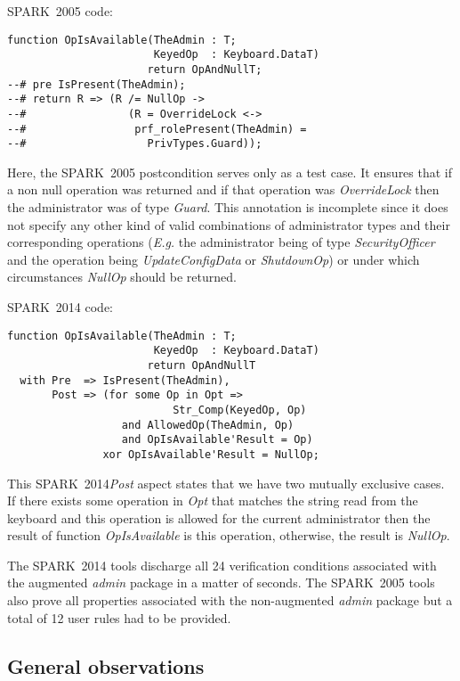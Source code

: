 \documentclass[10pt,a4paper,twocolumn]{article}
\newcommand{\oldspark}{SPARK~2005\xspace}
\newcommand{\newspark}{SPARK~2014\xspace}
\newcommand{\Eg}{\textit{E.g.}\xspace}
\begin{document}
\oldspark code:

\begin{lstlisting}
function OpIsAvailable(TheAdmin : T;
                       KeyedOp  : Keyboard.DataT)
                      return OpAndNullT;
--# pre IsPresent(TheAdmin);
--# return R => (R /= NullOp ->
--#                (R = OverrideLock <->
--#                 prf_rolePresent(TheAdmin) =
--#                   PrivTypes.Guard));
\end{lstlisting}
Here, the \oldspark postcondition serves only as a test case. It
ensures that if a non null operation was returned and if that
operation was \emph{OverrideLock} then the administrator was of type
\emph{Guard}. This annotation is incomplete since it does not specify
any other kind of valid combinations of administrator types and their
corresponding operations (\Eg the administrator being of type
\emph{SecurityOfficer} and the operation being \emph{UpdateConfigData}
or \emph{ShutdownOp}) or under which circumstances \emph{NullOp}
should be returned.

\newspark code:

\begin{lstlisting}
function OpIsAvailable(TheAdmin : T;
                       KeyedOp  : Keyboard.DataT)
                      return OpAndNullT
  with Pre  => IsPresent(TheAdmin),
       Post => (for some Op in Opt =>
                          Str_Comp(KeyedOp, Op)
                  and AllowedOp(TheAdmin, Op)
                  and OpIsAvailable'Result = Op)
               xor OpIsAvailable'Result = NullOp;
\end{lstlisting}
This \newspark \emph{Post} aspect states that we have two mutually
exclusive cases. If there exists some operation in \emph{Opt} that
matches the string read from the keyboard and this operation is
allowed for the current administrator then the result of function
\emph{OpIsAvailable} is this operation, otherwise, the result is
\emph{NullOp}.

The \newspark tools discharge all 24 verification conditions
associated with the augmented \emph{admin} package in a matter of
seconds. The \oldspark tools also prove all properties associated with
the non-augmented \emph{admin} package but a total of 12 user rules had
to be provided.

\subsection{General observations}
\end{document}
